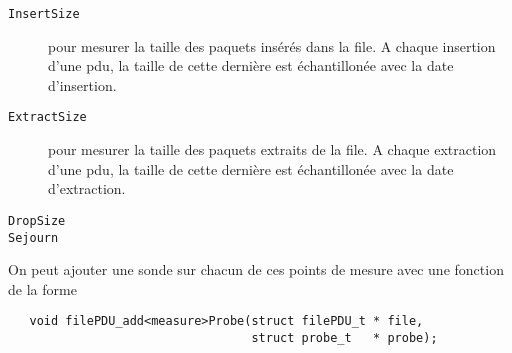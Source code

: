 \begin{description}
   \item[{\tt InsertSize}] pour mesurer la taille des paquets insérés
     dans la file. A chaque insertion d'une {\sc pdu}, la taille de
     cette dernière est échantillonée avec la date d'insertion.
   \item[{\tt ExtractSize}] pour mesurer la taille des paquets extraits
     de la file. A chaque extraction d'une {\sc pdu}, la taille de
     cette dernière est échantillonée avec la date d'extraction.
   \item[{\tt DropSize}]
   \item[{\tt Sejourn}]
\end{description}

   On peut ajouter une sonde sur chacun de ces points de mesure avec
une fonction de la forme

\begin{verbatim}
   void filePDU_add<measure>Probe(struct filePDU_t * file,
                                  struct probe_t   * probe);
\end{verbatim}

